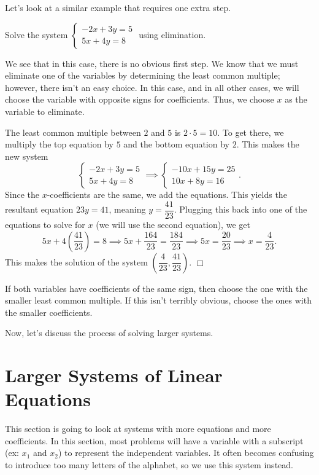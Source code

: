 \documentclass[../book.tex]{subfiles}
\begin{document}
Let's look at a similar example that requires one extra step.
\begin{example}
Solve the system $\begin{cases} -2x+3y=5 \\ 5x+4y=8\end{cases}$ using elimination.
\end{example}
\begin{solution}
We see that in this case, there is no obvious first step.  We know that we must eliminate one of the variables by determining the least common multiple; however, there isn't an easy choice.  In this case, and in all other cases, we will choose the variable with opposite signs for coefficients.  Thus, we choose $x$ as the variable to eliminate.  

The least common multiple between $2$ and $5$ is $2\cdot 5=10$.  To get there, we multiply the top equation by $5$ and the bottom equation by $2$.  This makes the new system $$\begin{cases} -2x+3y=5 \\ 5x+4y=8\end{cases}\implies \begin{cases} -10x+15y=25 \\ 10x+8y=16 \end{cases}.$$  Since the $x$-coefficients are the same, we add the equations.  This yields the resultant equation $23y=41$, meaning $y=\dfrac{41}{23}.$  Plugging this back into one of the equations to solve for $x$ (we will use the second equation), we get $$5x+4\left(\dfrac{41}{23}\right)=8 \implies 5x+\dfrac{164}{23}=\dfrac{184}{23} \implies 5x=\dfrac{20}{23}\implies x=\dfrac{4}{23}.$$  This makes the solution of the system $\left(\dfrac{4}{23},\dfrac{41}{23}\right)$.  $\Box$
\end{solution}

\begin{remark}
If both variables have coefficients of the same sign, then choose the one with the smaller least common multiple.  If this isn't terribly obvious, choose the ones with the smaller coefficients.
\end{remark}

Now, let's discuss the process of solving larger systems.
\section{Larger Systems of Linear Equations}
\noindent This section is going to look at systems with more equations and more coefficients.  In this section, most problems will have a variable with a subscript (ex: $x_1$ and $x_2$) to represent the independent variables.  It often becomes confusing to introduce too many letters of the alphabet, so we use this system instead.
\end{document}
